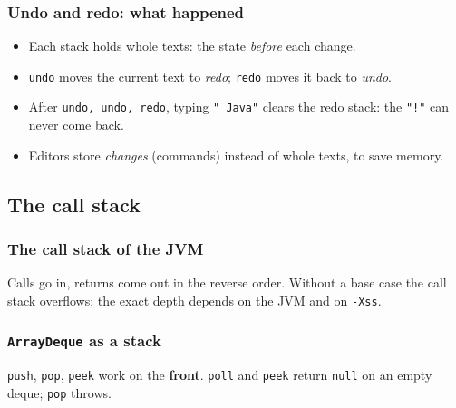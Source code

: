 \documentclass[aspectratio=169,10pt,compress]{beamer}
\begin{document}
\begin{frame}[t,fragile] \frametitle{Undo and redo: what happened}
  \begin{itemize}\small
    \item Each stack holds whole texts: the state \emph{before} each change.
    \item \texttt{undo} moves the current text to \emph{redo}; \texttt{redo} moves it back to \emph{undo}.
    \item After \texttt{undo, undo, redo}, typing \texttt{" Java"} clears the redo stack: the \texttt{"!"} can never come back.
    \item Editors store \emph{changes} (commands) instead of whole texts, to save memory.
  \end{itemize}
\end{frame}

\subsection[Calls]{The call stack}




\begin{frame}[t,fragile] \frametitle{The call stack of the JVM}

  \vspace{0.2em}
  \small Calls go in, returns come out in the reverse order. Without a base case the call stack overflows; the exact depth depends on the JVM and on \texttt{-Xss}.
\end{frame}





\begin{frame}[t,fragile] \frametitle{\texttt{ArrayDeque} as a stack}

  \vspace{0.2em}
  \small \texttt{push}, \texttt{pop}, \texttt{peek} work on the \textbf{front}. \texttt{poll} and \texttt{peek} return \texttt{null} on an empty deque; \texttt{pop} throws.
\end{frame}
\end{document}

